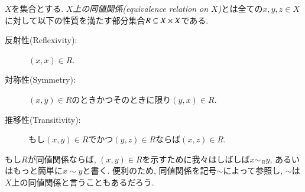 \begin{definition}


$X$を集合とする. \emph{$X$上の同値関係(equivalence relation on $X$)}とは全ての$x,y,z\in X$に対して以下の性質を満たす部分集合$R\ss X\times X$である.
\begin{description}
\item[反射性(Reflexivity):] $(x,x)\in R$.
\item[対称性(Symmetry):] $(x,y)\in R$のときかつそのときに限り$(y,x)\in R$.
\item[推移性(Transitivity):] もし$(x,y)\in R$でかつ$(y,z)\in R$ならば$(x,z)\in R$.
\end{description}
もし$R$が同値関係ならば, $(x,y)\in R$を示すために我々はしばしば$x\sim_R y$, あるいはもっと簡単に$x\sim y$と書く. 便利のため, 同値関係を記号$\sim$によって参照し, $\sim$は$X$上の同値関係と言うこともあるだろう.



\end{definition}
